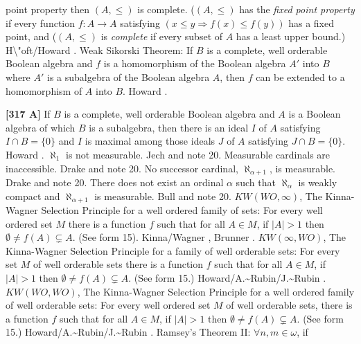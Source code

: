 point property then $(A,\le)$ is complete. ($(A,\le)$  has the {\it fixed
point property} if every function $f:A\to A$ satisfying $(x\le y
\Rightarrow f(x)\le f(y))$ has a fixed point, and ($(A,\le)$ is
{\it complete} if every subset of $A$ has a least upper bound.)
\ac{H\"oft/Howard} \cite{1994}.
\medskip
{} Weak Sikorski Theorem:  If $B$ is a complete,
well orderable Boolean algebra and $f$ is a homomorphism of the Boolean
algebra $A'$ into $B$ where $A'$ is a subalgebra of the Boolean algebra
$A$, then $f$ can be extended to a homomorphism of $A$ into $B$.
\ac{Howard} \cite{1973}. 
\smallskip
\item{}{\bf [317 A]} If $B$ is a complete, well orderable Boolean algebra
and $A$ is a Boolean algebra of which $B$ is a subalgebra, then there is
an ideal $I$ of $A$ satisfying $I\cap B=\{0\}$ and $I$ is maximal among
those ideals $J$ of $A$ satisfying $J \cap B = \{0\}$.  \ac{Howard}
\cite{1973}.
\medskip
{} $\aleph_1$ is not measurable.
\ac{Jech} \cite{1968a} and note 20.
\medskip
{} Measurable cardinals are inaccessible. \ac{Drake}
\cite{1974} and note 20.
\medskip
{} No successor cardinal, $\aleph_{\alpha+1}$, is
measurable. \ac{Drake} \cite{1974} and note 20.
\medskip
{} There does not exist an ordinal
$\alpha$ such that $\aleph_{\alpha}$ is weakly compact and
$\aleph_{\alpha+1}$ is measurable. \ac{Bull} \cite{1978} and note 20.
\medskip
{} $KW(WO,\infty)$, The Kinna-Wagner Selection
Principle for a well ordered family of sets: For every  well ordered set
$M$ there is a function $f$ such that for all $A\in M$, if $|A|>1$ then
$\emptyset\neq f(A)\subsetneq A$.  (See form 15).
\ac{Kinna/Wagner} \cite{1955}, \ac{Brunner} \cite{1982a}.
\medskip
{} $KW(\infty,WO)$, The Kinna-Wagner Selection
Principle for a family of well orderable sets: For every set $M$ of
well orderable sets there is a function $f$ such that for all $A\in M$,
if $|A| > 1$ then $\emptyset\neq f(A)\subsetneq A$.  (See form 15.)
\ac{Howard/A.~Rubin/J.~Rubin}  \cite{1997}.
\medskip
{} $KW(WO,WO)$, The Kinna-Wagner Selection Principle
for a well ordered family of well orderable sets: For every well ordered
set $M$ of well orderable sets, there is a function $f$ such that for all
$A\in M$, if $|A| > 1$ then $\emptyset\neq f(A)\subsetneq A$.
(See form 15.) \ac{Howard/A.~Rubin/J.~Rubin} \cite{1997}.
\medskip
{} Ramsey's Theorem II: $\forall n,m\in\omega$, if
